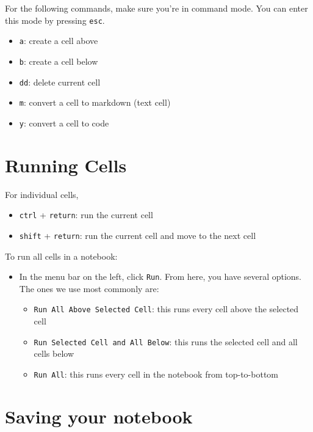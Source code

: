 \documentclass[
  letterpaper,
  DIV=11,
  numbers=noendperiod]{scrreprt}
\providecommand{\tightlist}{%
  \setlength{\itemsep}{0pt}\setlength{\parskip}{0pt}}\usepackage{longtable,booktabs,array}
\begin{document}
For the following commands, make sure you're in command mode. You can
enter this mode by pressing \texttt{esc}.

\begin{itemize}
\tightlist
\item
  \texttt{a}: create a cell above
\item
  \texttt{b}: create a cell below
\item
  \texttt{dd}: delete current cell
\item
  \texttt{m}: convert a cell to markdown (text cell)
\item
  \texttt{y}: convert a cell to code
\end{itemize}

\section{Running Cells}\label{running-cells}

For individual cells,

\begin{itemize}
\tightlist
\item
  \texttt{ctrl} + \texttt{return}: run the current cell
\item
  \texttt{shift} + \texttt{return}: run the current cell and move to the
  next cell
\end{itemize}

To run all cells in a notebook:

\begin{itemize}
\item
  In the menu bar on the left, click \texttt{Run}. From here, you have
  several options. The ones we use most commonly are:

  \begin{itemize}
  \tightlist
  \item
    \texttt{Run\ All\ Above\ Selected\ Cell}: this runs every cell above
    the selected cell
  \item
    \texttt{Run\ Selected\ Cell\ and\ All\ Below}: this runs the
    selected cell and all cells below
  \item
    \texttt{Run\ All}: this runs every cell in the notebook from
    top-to-bottom
  \end{itemize}
\end{itemize}

\section{Saving your notebook}\label{saving-your-notebook}
\end{document}
